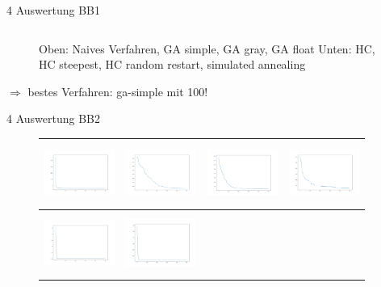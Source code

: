 \documentclass{ocbeameruni}
\begin{document}
\begin{frame}{4 Auswertung BB1}
\begin{center}
\begin{figure}
\begin{tabular}{|c|c|c|c|}
    \end{tabular}
    \caption{Oben: Naives Verfahren, GA simple, GA gray, GA float \hspace{\textwidth}Unten: HC, HC steepest, HC random restart, simulated annealing}
    \end{figure}
    $\Rightarrow$ bestes Verfahren: ga-simple mit 100!
    \end{center}
\end{frame}

\begin{frame}{4 Auswertung BB2}
    \begin{center}
    \begin{figure}
    \begin{tabular}{|c|c|c|c|} 
      \hline
      \includegraphics[width=23mm, height=20mm]{plots/bb2_naive.png} 
    & \includegraphics[width=23mm, height=20mm]{plots/bb2_ga_simple.png} 
    & \includegraphics[width=23mm, height=20mm]{plots/bb2_ga_gray.png}
    & \includegraphics[width=23mm, height=20mm]{plots/bb2_ga_float.png} \\ \hline
      \includegraphics[width=23mm, height=20mm]{plots/bb2_hc.png} 
    & \includegraphics[width=23mm, height=20mm]{plots/bb2_hc_sa.png} 

\end{tabular}
\end{figure}
\end{center}
\end{frame}
\end{document}
